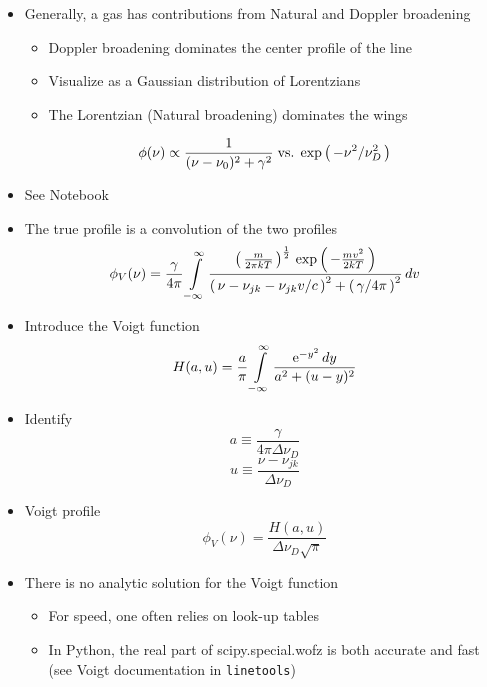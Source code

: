 \documentclass[12pt,letterpaper]{article}
\begin{document}
\begin{Aenumerate}
\begin{itemize}
	\begin{itemize}
	\item Generally, a gas has contributions from Natural and Doppler broadening
		\begin{itemize}
		\item Doppler broadening dominates the center profile of the line
		\item Visualize as a Gaussian distribution of Lorentzians
		\item The Lorentzian (Natural broadening) dominates the wings
		\end{itemize}
		\begin{equation}
		\phi(\nu) \propto \frac{1}{(\nu-\nu_0)^2 + \gamma^2} \; {\rm vs.}
		\; \exp \left ( \, -\nu^2/\nu_D^2 \, \right )
		\end{equation}
		\item See Notebook
	\item The true profile is a convolution of the two profiles
	\begin{equation}
	\phi_V(\nu) = \frac{\gamma}{4\pi} \int\limits_{-\infty}^\infty
	\frac{ \left ( \, \frac{m}{2\pi kT} \, \right )^{\frac{1}{2}} \, \exp \left ( \, - \frac{mv^2}{2kT} \, \right )}
	{\left ( \, \nu-\nu_{jk}-\nu_{jk}v/c \, \right )^2 + \left ( \, \gamma/4\pi \, \right )^2} \, dv
	\end{equation}
	\item Introduce the Voigt function
	\begin{equation}
	H(a,u) = \frac{a}{\pi} \int\limits_{-\infty}^\infty 
		\frac{{\rm e}^{-y^2} \, dy}{a^2 + (u-y)^2}
	\end{equation}
	\item Identify
	\begin{equation}
	a \equiv \frac{\gamma}{4\pi \Delta\nu_D}
	\end{equation}
	\begin{equation}
	u \equiv \frac{\nu-\nu_{jk}}{\Delta\nu_D}
	\end{equation}
	\item Voigt profile
	\begin{equation}
	\phi_V(\nu) = \frac{H(a,u)}{\Delta\nu_D \sqrt{\pi}}
	\end{equation}
	\item There is no analytic solution for the Voigt function
		\begin{itemize}
		\item For speed, one often relies on look-up tables
		\item In Python, the real part of
		scipy.special.wofz is both accurate and fast (see
		Voigt documentation in {\tt linetools})
		\end{itemize}



\end{itemize}
\end{itemize}
\end{Aenumerate}
\end{document}
